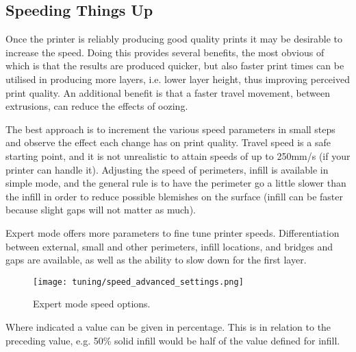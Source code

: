 
\subsection{Speeding Things Up} %
\label{sec:speeding_things_up}

Once the printer is reliably producing good quality prints it may be desirable to increase the speed.  Doing this provides several benefits, the most obvious of which is that the results are produced quicker, but also faster print times can be utilised in producing more layers, i.e. lower layer height, thus improving perceived print quality.  An additional benefit is that a faster travel movement, between extrusions, can reduce the effects of oozing.

The best approach is to increment the various speed parameters in small steps and observe the effect each change has on print quality.  Travel speed is a safe starting point, and it is not unrealistic to attain speeds of up to 250mm/s (if your printer can handle it).  Adjusting the speed of perimeters, infill is available in simple mode, and the general rule is to have the perimeter go a little slower than the infill in order to reduce possible blemishes on the surface (infill can be faster because slight gaps will not matter as much).

Expert mode offers more parameters to fine tune printer speeds.  Differentiation between external, small and other perimeters, infill locations, and bridges and gaps are available, as well as the ability to slow down for the first layer.

\begin{figure}[H]
\centering
\texttt{[image: tuning/speed\_advanced\_settings.png]}
\caption{Expert mode speed options.}
\label{fig:speed_advanced_settings}
\end{figure}

Where indicated a value can be given in percentage.  This is in relation to the preceding value, e.g. 50\% solid infill would be half of the value defined for infill.

